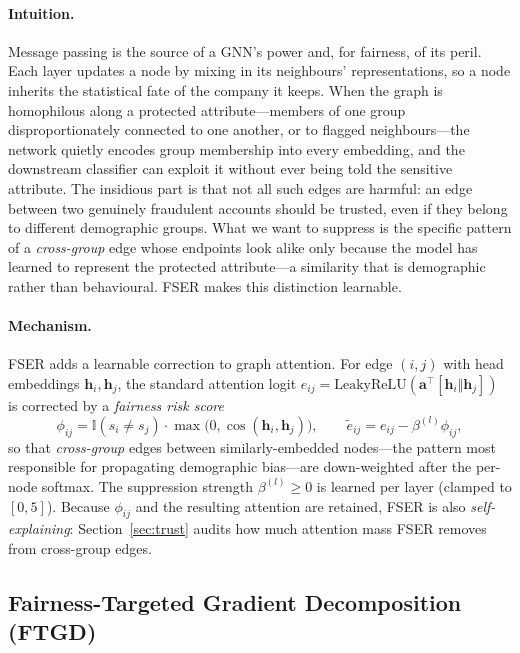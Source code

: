 \documentclass[pdflatex,sn-mathphys-num]{sn-jnl}
\theoremstyle{thmstyleone}%
\theoremstyle{thmstyletwo}%
\theoremstyle{thmstylethree}%
\begin{document}
\paragraph{Intuition.}
Message passing is the source of a GNN's power and, for fairness, of its
peril. Each layer updates a node by mixing in its neighbours' representations,
so a node inherits the statistical fate of the company it keeps. When the graph
is homophilous along a protected attribute---members of one group
disproportionately connected to one another, or to flagged neighbours---the
network quietly encodes group membership into every embedding, and the
downstream classifier can exploit it without ever being told the sensitive
attribute. The insidious part is that not all such edges are harmful: an edge
between two genuinely fraudulent accounts should be trusted, even if they belong
to different demographic groups. What we want to suppress is the specific
pattern of a \emph{cross-group} edge whose endpoints look alike only because the
model has learned to represent the protected attribute---a similarity that is
demographic rather than behavioural. FSER makes this distinction learnable.

\paragraph{Mechanism.}
FSER adds a learnable correction to graph attention. For edge $(i,j)$ with head
embeddings
$\mathbf{h}_i,\mathbf{h}_j$, the standard attention logit
$e_{ij}=\mathrm{LeakyReLU}(\mathbf{a}^\top[\mathbf{h}_i\Vert\mathbf{h}_j])$ is
corrected by a \emph{fairness risk score}
\begin{equation}
\phi_{ij}=\mathbb{I}(s_i\neq s_j)\cdot\max\!\big(0,\cos(\mathbf{h}_i,\mathbf{h}_j)\big),
\qquad
\tilde{e}_{ij}=e_{ij}-\beta^{(l)}\phi_{ij},
\end{equation}
so that \emph{cross-group} edges between similarly-embedded nodes---the pattern
most responsible for propagating demographic bias---are down-weighted after the
per-node softmax. The suppression strength $\beta^{(l)}\!\ge\!0$ is learned per
layer (clamped to $[0,5]$). Because $\phi_{ij}$ and the resulting attention are
retained, FSER is also \emph{self-explaining}: Section~\ref{sec:trust}
audits how much attention mass FSER removes from cross-group edges.

\subsection{Fairness-Targeted Gradient Decomposition (FTGD)}
\label{sec:ftgd}
\end{document}
